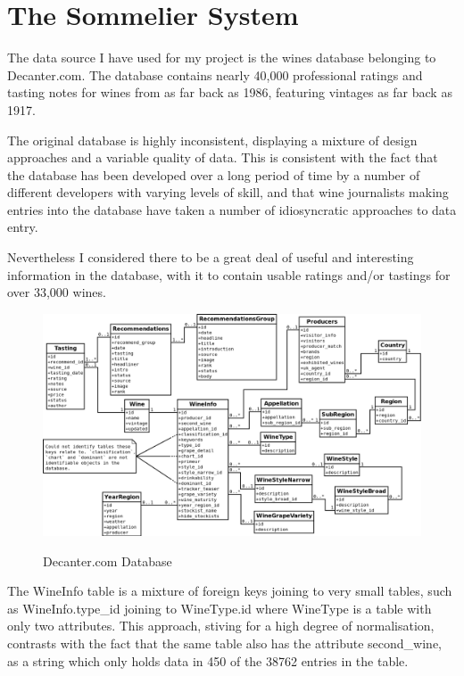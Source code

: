 \section{The Sommelier System}\label{design}


The data source I have used for my project is the wines database belonging to Decanter.com\cite{DecanterCom}. The database contains nearly 40,000 professional ratings and tasting notes for wines from as far back as 1986, featuring vintages as far back as 1917.

The original database is highly inconsistent, displaying a mixture of design approaches and a variable quality of data. This is consistent with the fact that the database has been developed over a long period of time by a number of different developers with varying levels of skill, and that wine journalists making entries into the database have taken a number of idiosyncratic approaches to data entry.

Nevertheless I considered there to be a great deal of useful and interesting information in the database, with it to contain usable ratings and/or tastings for over 33,000 wines.

\begin{figure}[h!]
    \caption{Decanter.com Database}
    \centering
        \includegraphics[width=14cm]{DecanterWineDB}
    \label{fig:decanterdb}
\end{figure}

The WineInfo table is a mixture of foreign keys joining to very small tables, such as WineInfo.type\_id joining to WineType.id where WineType is a table with only two attributes. This approach, stiving for a high degree of normalisation, contrasts with the fact that the same table also has the attribute second\_wine, as a string which only holds data in 450 of the 38762 entries in the table.


